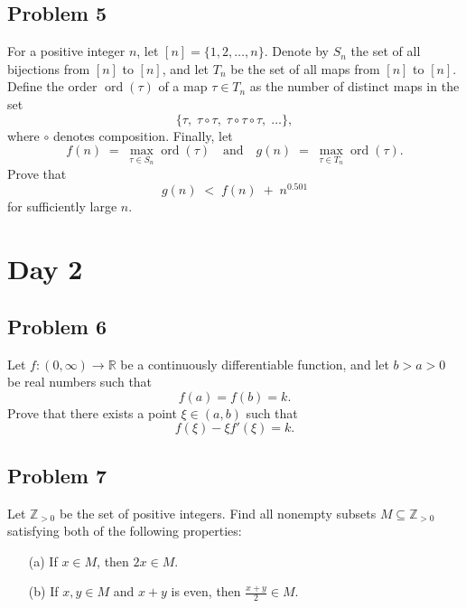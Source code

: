 \documentclass{article}
\begin{document}
    \subsection*{Problem 5}
    For a positive integer $n$, let $[n] = \{1,2,\dots,n\}$. Denote by $S_n$ the set of all bijections from $[n]$ to $[n]$, and let $T_n$ be the set of all maps from $[n]$ to $[n]$. Define the order $\operatorname{ord}(\tau)$ of a map $\tau\in T_n$ as the number of distinct maps in the set
    \[
        \{\tau,\;\tau\circ\tau,\;\tau\circ\tau\circ\tau,\;\dots\},
    \]
    where $\circ$ denotes composition.  Finally, let
    \[
        f(n) \;=\;\max_{\tau\in S_n}\operatorname{ord}(\tau)
        \quad\text{and}\quad
        g(n) \;=\;\max_{\tau\in T_n}\operatorname{ord}(\tau).
    \]
    Prove that
    \[
        g(n) \;<\; f(n) \;+\; n^{0.501}
    \]
    for sufficiently large $n$.

    \section*{Day 2}

    \subsection*{Problem 6}
    Let $f:(0,\infty)\to\mathbb{R}$ be a continuously differentiable function, and let $b>a>0$ be real numbers such that
    \[
        f(a) = f(b) = k.
    \]
    Prove that there exists a point $\xi \in (a,b)$ such that
    \[
        f(\xi) - \xi f'(\xi) = k.
    \]

    \subsection*{Problem 7}
    Let $\mathbb{Z}_{>0}$ be the set of positive integers. Find all nonempty subsets $M \subseteq \mathbb{Z}_{>0}$ satisfying both of the following properties:
    \begin{enumerate}
        \item[(a)] If $x \in M$, then $2x \in M$.
        \item[(b)] If $x,y \in M$ and $x + y$ is even, then $\tfrac{x + y}{2} \in M$.
    \end{enumerate}
\end{document}
